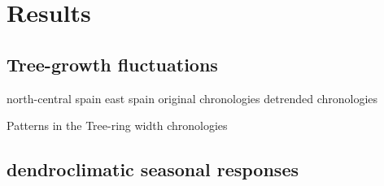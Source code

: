 \documentclass[review,authoryear]{elsarticle}
\begin{document}


\section{Results}

\subsection{Tree-growth fluctuations}
north-central spain
east spain
original chronologies
detrended chronologies

Patterns in the Tree-ring width chronologies 

\subsection{dendroclimatic seasonal responses}
\end{document}
